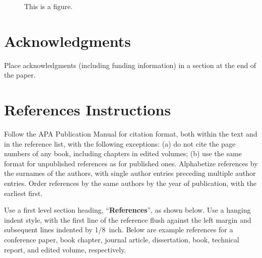 \documentclass[10pt,letterpaper]{article}
\begin{document}
\begin{figure}[ht]
\begin{center}
\end{center}
\caption{This is a figure.} 
\label{sample-figure}
\end{figure}


\section{Acknowledgments}

Place acknowledgments (including funding information) in a section at
the end of the paper.


\section{References Instructions}

Follow the APA Publication Manual for citation format, both within the
text and in the reference list, with the following exceptions: (a) do
not cite the page numbers of any book, including chapters in edited
volumes; (b) use the same format for unpublished references as for
published ones. Alphabetize references by the surnames of the authors,
with single author entries preceding multiple author entries. Order
references by the same authors by the year of publication, with the
earliest first.

Use a first level section heading, ``{\bf References}'', as shown
below. Use a hanging indent style, with the first line of the
reference flush against the left margin and subsequent lines indented
by 1/8~inch. Below are example references for a conference paper, book
chapter, journal article, dissertation, book, technical report, and
edited volume, respectively.

\nocite{ChalnickBillman1988a}
\nocite{Feigenbaum1963a}
\nocite{Hill1983a}
\nocite{OhlssonLangley1985a}
\nocite{Matlock2001}
\nocite{NewellSimon1972a}
\nocite{ShragerLangley1990a}




\setlength{\bibleftmargin}{.125in}
\setlength{\bibindent}{-\bibleftmargin}


\end{document}
